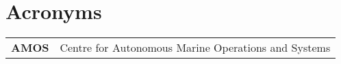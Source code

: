 \chapter*{Acronyms}
\begin{tabular}{l l}
\textbf{AMOS} & Centre for Autonomous Marine Operations and Systems\\
\end{tabular}
